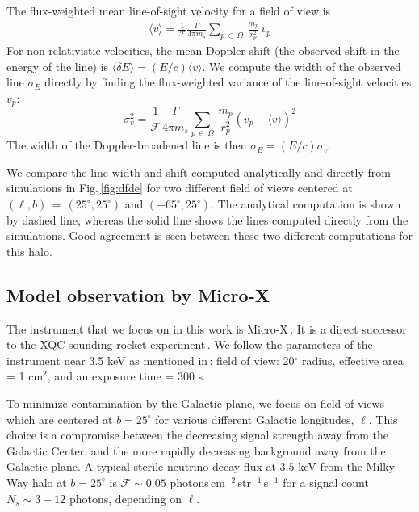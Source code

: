 \documentclass[aps,prd,10pt,twocolumn,superscriptaddress,showpacs]{revtex4-1}
\begin{document}
The flux-weighted mean line-of-sight velocity for a field of view is 
\begin{eqnarray} 
	\langle v\rangle =\frac{1}{\mathcal{F}} \frac{\Gamma}{4\pi m_s} \sum_{p \, \in \, \Omega}
	\, \frac{m_p}{r_p^{2}} \, v_p
\label{eq:simcenter}
\end{eqnarray}
For non relativistic velocities, the mean Doppler shift (the observed shift in the energy of the line) is $\langle \delta E\rangle = (E/c)\langle v \rangle$.  We compute the width of the observed line $\sigma_E$ directly by finding the flux-weighted
variance of the line-of-sight velocities $v_p$:
\begin{equation} 
	\sigma_v^2 =\frac{1}{\mathcal{F}} \frac{\Gamma}{4\pi m_s} \sum_{p \, \in \, \Omega}
	\, \frac{m_p}{r_p^{2}} \left(v_p-\langle v\rangle\right)^2 
\label{eq:simsigma}
\end{equation}
The width of the Doppler-broadened line is then $\sigma_E = (E/c) \sigma_v$. 

We compare the line width and shift computed analytically and directly from simulations in Fig.\,\ref{fig:dfde} for two different field of views centered at $(\ell, b) \, = \, (25^\circ, 25^\circ)$ and $(-65^\circ, 25^\circ)$.  The analytical computation is shown by dashed line, whereas the solid line shows the lines computed directly from the simulations.  Good agreement is seen between these two different computations for this halo.

\subsection{Model observation by Micro-X}
\label{sec:microx}

The instrument that we focus on in this work is Micro-X\,\cite{Figueroa-Feliciano:2015gwa}.  It is a direct successor to the XQC sounding rocket experiment\,\cite{McCammon:2002gb,Boyarsky:2006hr,Crowder:2012ts}.  We follow the parameters of the instrument near 3.5 keV as mentioned in\,\cite{Figueroa-Feliciano:2015gwa}: field of view: 20$^\circ$ radius, effective area = 1 cm$^2$, and an exposure time = 300 s. 

To minimize contamination by the Galactic plane, we focus on field of views which are centered at $b = 25^\circ$ for various different Galactic longitudes, $\ell$.  This choice is a compromise between the decreasing signal strength away from the Galactic Center, and the more rapidly decreasing background away from the Galactic plane.  A typical sterile neutrino decay flux at $3.5$ keV from
the Milky Way halo at $b=25^\circ$ is $\mathcal{F}\sim 0.05$ photons\,cm$^{-2}$\,str$^{-1}$\,s$^{-1}$ 
for a signal count $N_s \sim 3-12$ photons, depending on $\ell$. 
\end{document}
